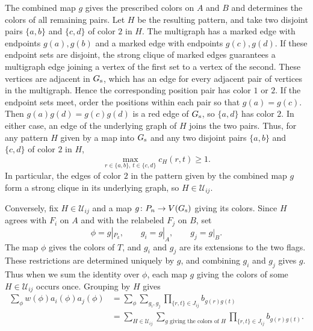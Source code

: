 \documentclass[preprint,11pt,numbers]{elsarticle-arxiv}
\numberwithin{equation}{section}
\theoremstyle{definition}
\begin{document}
The combined map $g$ gives the prescribed colors on $A$ and $B$
and determines the colors of all remaining pairs. Let $H$ be the
resulting pattern, and take two disjoint pairs $\{a,b\}$ and
$\{c,d\}$ of color $2$ in $H$. The multigraph has a marked edge
with endpoints $g(a),g(b)$ and a marked edge with endpoints
$g(c),g(d)$. If these endpoint sets are disjoint, the strong clique
of marked edges guarantees a multigraph edge joining a vertex of the
first set to a vertex of the second. These vertices are adjacent in
$G_{\rm s}$, which has an edge for every adjacent pair of vertices
in the multigraph. Hence the corresponding position pair has color
$1$ or $2$. If the endpoint sets meet, order the positions within
each pair so that $g(a)=g(c)$. Then $g(a)g(d)=g(c)g(d)$ is a red
edge of $G_{\rm s}$, so $\{a,d\}$ has color $2$. In either case, an
edge of the underlying graph of $H$ joins the two pairs. Thus,
for any pattern $H$ given by a map into $G_{\rm s}$ and any two
disjoint pairs $\{a,b\}$ and $\{c,d\}$ of color $2$ in $H$,
\begin{equation}\label{eq:weighted-joining-edge}
 \max_{r\in\{a,b\},\,t\in\{c,d\}} c_H(r,t)\geq 1.
\end{equation}
In particular, the edges of color $2$ in the pattern given by the
combined map $g$ form a strong clique in its underlying graph, so
$H\in\mathcal U_{ij}$.

Conversely, fix $H\in\mathcal U_{ij}$ and a map
$g\colon P_n\to V(G_{\rm s})$ giving its colors. Since $H$ agrees
with $F_i$ on $A$ and with the relabeled $F_j$ on $B$, set
\[
 \phi=g|_{P_k},\qquad g_i=g|_A,\qquad g_j=g|_B.
\]
The map $\phi$ gives the colors of $T$, and $g_i$ and $g_j$ are its
extensions to the two flags. These restrictions are determined
uniquely by $g$, and combining $g_i$ and $g_j$ gives $g$.
Thus when we sum the identity over $\phi$, each map $g$ giving the
colors of some $H\in\mathcal U_{ij}$ occurs once. Grouping by $H$ gives
\[
\begin{aligned}
 \sum_\phi w(\phi)a_i(\phi)a_j(\phi)
 &=\sum_\phi\sum_{g_i,g_j}
  \prod_{\{r,t\}\in J_{ij}} b_{g(r)g(t)}\\
 &=\sum_{H\in\mathcal U_{ij}}
  \sum_{g\text{ giving the colors of }H}
  \prod_{\{r,t\}\in J_{ij}} b_{g(r)g(t)}.
\end{aligned}
\]
\end{document}
